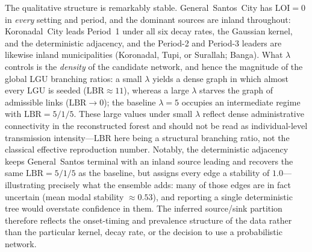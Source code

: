 \documentclass[a4paper,11pt]{article}
\begin{document}
The qualitative structure is remarkably stable. General~Santos~City has $\mathrm{LOI}=0$ in
\emph{every} setting and period, and the dominant sources are inland throughout:
Koronadal~City leads Period~1 under all six decay rates, the Gaussian kernel, and the
deterministic adjacency, and the Period-2 and Period-3 leaders are likewise inland
municipalities (Koronadal, Tupi, or Surallah; Banga). What $\lambda$ controls is
the \emph{density} of the candidate network, and hence the magnitude of the global
LGU branching ratios: a small $\lambda$ yields a dense graph in which almost every LGU
is seeded ($\mathrm{LBR}\approx 11$), whereas a large $\lambda$ starves the graph of admissible
links ($\mathrm{LBR}\to 0$); the baseline $\lambda=5$ occupies an intermediate regime with
$\mathrm{LBR} = 5/1/5$. These large values under small $\lambda$ reflect dense administrative
connectivity in the reconstructed forest and should not be read as individual-level
transmission intensity---$\mathrm{LBR}$ here being a structural branching ratio, not the
classical effective reproduction number. Notably, the deterministic adjacency keeps General~Santos terminal with an inland
source leading and recovers the same $\mathrm{LBR} = 5/1/5$ as the baseline, but assigns every edge a stability of
$1.0$---illustrating precisely what the ensemble adds: many of those edges are in fact
uncertain (mean modal stability $\approx 0.53$), and reporting a single deterministic
tree would overstate confidence in them. The inferred source/sink partition therefore
reflects the onset-timing and prevalence structure of the data rather than the
particular kernel, decay rate, or the decision to use a probabilistic network.
\end{document}
